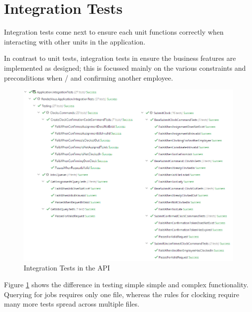 \section{Integration Tests}

Integration tests come next to ensure each unit functions
correctly when interacting with other units in the
application.

In contrast to unit tests, integration tests in
\projectname{} ensure the business features are implemented
as designed; this is focussed mainly on the various
constraints and preconditions when
/ 
and confirming another employee.

\begin{figure}[h]
  \centering
  \includegraphics[width=0.9\linewidth]{07 testing/assets/integration/test runner.png}
  \caption{Integration Tests in the API}
  \label{fig:integrationTestRunner}
\end{figure}

Figure \ref{fig:integrationTestRunner} shows the difference
in testing simple simple and complex functionality.
Querying for jobs requires only one file, whereas the rules
for clocking require many more tests spread across multiple
files.

